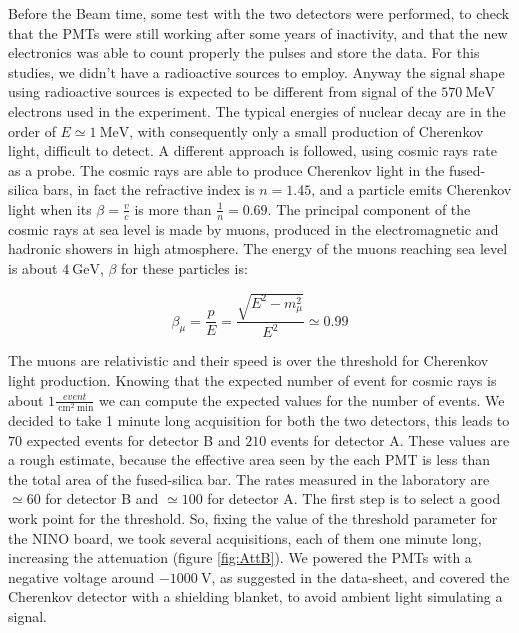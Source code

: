 Before the Beam time, some test with the two detectors were performed, to check that the PMTs were still working after some years of inactivity, and that the new electronics was able to count properly the pulses and store the data. For this studies, we didn't have a radioactive sources to employ. Anyway the signal shape using radioactive sources is expected to be different from signal of the $\SI{570}{\mega \electronvolt}$ electrons used in the experiment. The typical energies of nuclear decay are in the order of $E \simeq \SI{1}{\mega \electronvolt}$,  with consequently only a small production of Cherenkov light, difficult to detect. A different approach is followed, using cosmic rays rate as a probe. 
The cosmic rays are able to produce Cherenkov light in the fused-silica bars, in fact the refractive index is $n = 1.45$, and a particle emits Cherenkov light when its $\beta = \frac{v}{c}$ is more than $\frac{1}{n} = 0.69$. The principal component of the cosmic rays at sea level is made by muons, produced in the electromagnetic and hadronic showers in high atmosphere. The energy of the muons reaching sea level is about $\SI{4}{\giga \electronvolt}$, $\beta$ for these particles is:

\begin{equation}
\beta_{\mu} = \dfrac{p}{E} = \dfrac{\sqrt{E^{2} - m_{\mu}^{2}}}{ E^{2}} \simeq 0.99
\end{equation}

The muons are relativistic and their speed is over the threshold for Cherenkov light production. Knowing that the expected number of event for cosmic rays is about $1 \frac{event}{\SI{}{\centi \meter\squared} \SI{}{\minute}}$ we can compute the expected values for the number of events. We decided to take 1 minute long acquisition for both the two detectors, this leads to $70$ expected events for detector B  and  $210$ events for detector A. These values are a rough estimate, because the effective area seen by the each PMT is less than the total area of the fused-silica bar. The rates measured in the laboratory are $\simeq 60$ for detector B and $\simeq 100$ for detector A.     
The first step is to select a good work point for the threshold. So, fixing the value of the threshold parameter for the NINO board, we took several acquisitions, each of them one minute long, increasing the attenuation (figure \ref{fig:AttB}). We powered the PMTs with a negative voltage around $\SI{-1000}{\volt}$, as suggested in the data-sheet, and covered the Cherenkov detector with a shielding blanket, to avoid ambient light simulating a signal.


